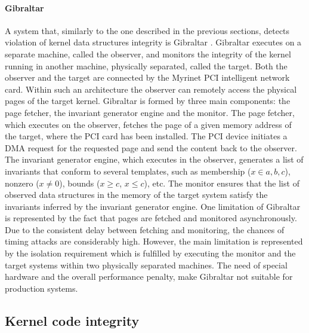 \paragraph{Gibraltar}
A system that, similarly to the one described in the previous sections, detects violation of kernel data structures integrity is Gibraltar \cite{6}. Gibraltar executes on a separate machine, called the observer, and monitors the integrity of the kernel running in another machine, physically separated, called the target. Both the observer and the target are connected by the Myrinet PCI intelligent network card. Within such an architecture the observer can remotely access the physical pages of the target kernel. Gibraltar is formed by three main components: the page fetcher, the invariant generator engine and the monitor. The page fetcher, which executes on the observer, fetches the page of a given memory address of the target, where the PCI card has been installed. The PCI device initiates a DMA request for the requested page and send the content back to the observer.
The invariant generator engine, which executes in the observer, generates a list of invariants that conform to several templates, such as membership ($x \in a,b,c$), nonzero ($x \neq 0$), bounds ($x \geq c$, $x \leq c$), etc. The monitor ensures that the list of observed data structures in the memory of the target system satisfy the invariants inferred by the invariant generator engine.
One limitation of Gibraltar is represented by the fact that pages are fetched and monitored asynchronously. Due to the consistent delay between fetching and monitoring, the chances of timing attacks are considerably high.
However, the main limitation is represented by the isolation requirement which is fulfilled by executing the monitor and the target systems within two physically separated machines. The need of special hardware and the overall performance penalty, make Gibraltar not suitable for production systems.  



\subsection{Kernel code integrity} \label{integrity}


